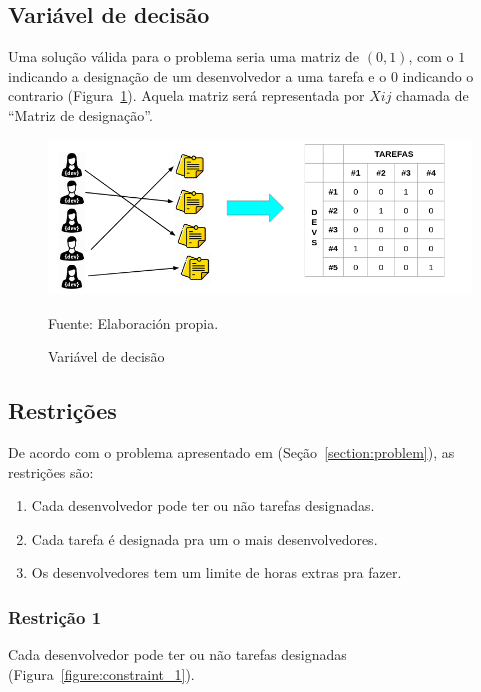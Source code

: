 \documentclass[12pt]{article}
\begin{document}
\subsection{Variável de decisão}

Uma solução válida para o problema seria uma matriz de $(0, 1)$, com o $1$ indicando a designação de um desenvolvedor a uma tarefa e o $0$ indicando o contrario (Figura~\ref{figure:decision_vars}). Aquela matriz será representada por $Xij$ chamada de ``Matriz de designação''.

\begin{figure}[!ht]
	\begin{center}
		\includegraphics[width=1\textwidth]{images/decision_vars}
	\end{center}
	\begin{center}
		\vskip -0.5cm
		\caption{\label{figure:decision_vars}
			\small{Variável de decisão}}
		{\small{Fuente: Elaboración propia.}}
	\end{center}
\end{figure}


\subsection{Restrições}

De acordo com o problema apresentado em (Seção~\ref{section:problem}), as restrições são: 

\begin{enumerate} 
	\item Cada desenvolvedor pode ter ou não tarefas designadas.
	\item Cada tarefa é designada pra um o mais desenvolvedores.
	\item Os desenvolvedores tem um limite de horas extras pra fazer.
\end{enumerate} 

\subsubsection{Restrição 1}
Cada desenvolvedor pode ter ou não tarefas designadas (Figura~\ref{figure:constraint_1}).
\end{document}
